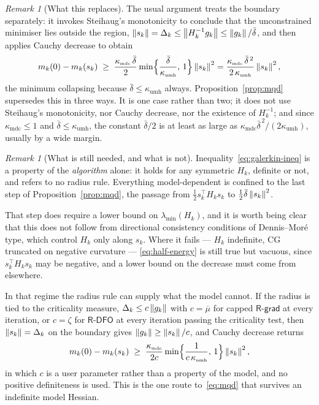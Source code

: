 \documentclass[11pt]{article}
\theoremstyle{plain}
\theoremstyle{definition}
\theoremstyle{remark}
\newtheorem{remark}[theorem]{Remark}
\numberwithin{equation}{section}
\newcommand*\mykappa[1]{\kappa_{\scriptscriptstyle\text{#1}}}
\newcommand{\kmdc}{\mykappa{mdc}}
\newcommand{\kumh}{\mykappa{umh}}
\newcommand{\Rdfo}{\textsf{R-DFO}}
\newcommand{\Rgrad}{\textsf{R-grad}}
\begin{document}
\begin{remark}[What this replaces]
    The usual argument treats the boundary separately: it invokes Steihaug's monotonicity to
    conclude that the unconstrained minimiser lies outside the region,
    $\left \lVert s_k \right \rVert = \Delta_k \leq \left \lVert H_k^{-1}g_k \right \rVert \leq \left \lVert g_k \right \rVert/\bar\delta$, and then applies
    Cauchy decrease to obtain
    \begin{equation*}
        m_k(0) - m_k(s_k) \;\geq\; \frac{\kmdc\,\bar\delta}{2}
            \min\Bigl\{\frac{\bar\delta}{\kumh},\, 1\Bigr\}\norm{s_k}^2
        = \frac{\kmdc\,\bar\delta^{\,2}}{2\,\kumh}\norm{s_k}^2 ,
    \end{equation*}
    the minimum collapsing because $\bar\delta \leq \kumh$ always. Proposition~\ref{prop:mqd}
    supersedes this in three ways. It is one case rather than two; it does not use Steihaug's
    monotonicity, nor Cauchy decrease, nor the existence of $H_k^{-1}$; and since
    $\kmdc \leq 1$ and $\bar\delta \leq \kumh$, the constant $\bar\delta/2$ is at least as large as
    $\kmdc\bar\delta^{\,2}/(2\kumh)$, usually by a wide margin.
\end{remark}

\begin{remark}[What is still needed, and what is not]
    Inequality~\eqref{eq:galerkin-ineq} is a property of the \emph{algorithm} alone: it holds for
    any symmetric $H_k$, definite or not, and refers to no radius rule. Everything model-dependent
    is confined to the last step of Proposition~\ref{prop:mqd}, the passage from
    $\tfrac12 s_k^\top H_ks_k$ to $\tfrac12\bar\delta\left \lVert s_k \right \rVert^2$.

    That step does require a lower bound on $\lambda_{\min}(H_k)$, and it is worth being clear that
    this does not follow from directional consistency conditions of Dennis--Mor\'e type, which
    control $H_k$ only along $s_k$. Where it fails --- $H_k$ indefinite, CG truncated on negative
    curvature --- \eqref{eq:half-energy} is still true but vacuous, since $s_k^\top H_ks_k$ may be
    negative, and a lower bound on the decrease must come from elsewhere.

    In that regime the radius rule can supply what the model cannot. If the radius is tied to the
    criticality measure, $\Delta_k \leq c\left \lVert g_k \right \rVert$ with $c = \overline{\mu}$ for capped $\Rgrad$
    at every iteration, or $c = \zeta$ for $\Rdfo$ at every iteration passing the criticality test,
    then $\left \lVert s_k \right \rVert = \Delta_k$ on the boundary gives $\left \lVert g_k \right \rVert \geq \left \lVert s_k \right \rVert/c$, and Cauchy
    decrease returns
    \begin{equation*}
        m_k(0) - m_k(s_k) \;\geq\; \frac{\kmdc}{2c}
            \min\Bigl\{\frac{1}{c\,\kumh},\, 1\Bigr\}\norm{s_k}^2 ,
    \end{equation*}
    in which $c$ is a user parameter rather than a property of the model, and no positive
    definiteness is used. This is the one route to~\eqref{eq:mqd} that survives an indefinite model
    Hessian.
\end{remark}
\end{document}
